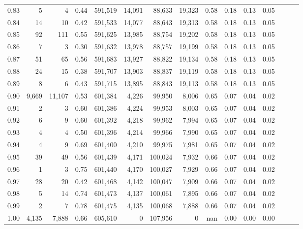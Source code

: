 \begin{tabular}{rrrrrrrrrrrrrrr}
0.83 &       5 &       4 &  0.44 &  591,519 &   14,091 &   88,633 &   19,323 &  0.58 &  0.18 &  0.13 &      0.05 \\
0.84 &      14 &      10 &  0.42 &  591,533 &   14,077 &   88,643 &   19,313 &  0.58 &  0.18 &  0.13 &      0.05 \\
0.85 &      92 &     111 &  0.55 &  591,625 &   13,985 &   88,754 &   19,202 &  0.58 &  0.18 &  0.13 &      0.05 \\
0.86 &       7 &       3 &  0.30 &  591,632 &   13,978 &   88,757 &   19,199 &  0.58 &  0.18 &  0.13 &      0.05 \\
0.87 &      51 &      65 &  0.56 &  591,683 &   13,927 &   88,822 &   19,134 &  0.58 &  0.18 &  0.13 &      0.05 \\
0.88 &      24 &      15 &  0.38 &  591,707 &   13,903 &   88,837 &   19,119 &  0.58 &  0.18 &  0.13 &      0.05 \\
0.89 &       8 &       6 &  0.43 &  591,715 &   13,895 &   88,843 &   19,113 &  0.58 &  0.18 &  0.13 &      0.05 \\
0.90 &   9,669 &  11,107 &  0.53 &  601,384 &    4,226 &   99,950 &    8,006 &  0.65 &  0.07 &  0.04 &      0.02 \\
0.91 &       2 &       3 &  0.60 &  601,386 &    4,224 &   99,953 &    8,003 &  0.65 &  0.07 &  0.04 &      0.02 \\
0.92 &       6 &       9 &  0.60 &  601,392 &    4,218 &   99,962 &    7,994 &  0.65 &  0.07 &  0.04 &      0.02 \\
0.93 &       4 &       4 &  0.50 &  601,396 &    4,214 &   99,966 &    7,990 &  0.65 &  0.07 &  0.04 &      0.02 \\
0.94 &       4 &       9 &  0.69 &  601,400 &    4,210 &   99,975 &    7,981 &  0.65 &  0.07 &  0.04 &      0.02 \\
0.95 &      39 &      49 &  0.56 &  601,439 &    4,171 &  100,024 &    7,932 &  0.66 &  0.07 &  0.04 &      0.02 \\
0.96 &       1 &       3 &  0.75 &  601,440 &    4,170 &  100,027 &    7,929 &  0.66 &  0.07 &  0.04 &      0.02 \\
0.97 &      28 &      20 &  0.42 &  601,468 &    4,142 &  100,047 &    7,909 &  0.66 &  0.07 &  0.04 &      0.02 \\
0.98 &       5 &      14 &  0.74 &  601,473 &    4,137 &  100,061 &    7,895 &  0.66 &  0.07 &  0.04 &      0.02 \\
0.99 &       2 &       7 &  0.78 &  601,475 &    4,135 &  100,068 &    7,888 &  0.66 &  0.07 &  0.04 &      0.02 \\
1.00 &   4,135 &   7,888 &  0.66 &  605,610 &        0 &  107,956 &        0 &   nan &  0.00 &  0.00 &      0.00 \\
\bottomrule
\end{tabular}
